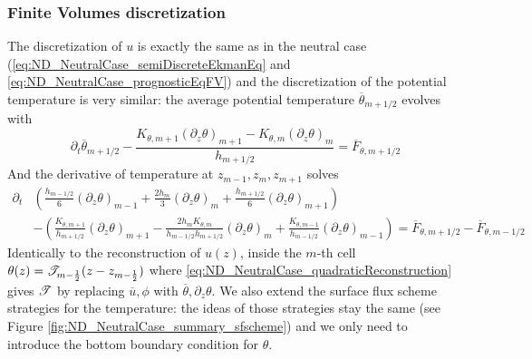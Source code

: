 \subsubsection{Finite Volumes discretization}
\label{sec:ND_StratifiedCase_FVDis}
The discretization of $u$ is exactly the same as in the
neutral case (\eqref{eq:ND_NeutralCase_semiDiscreteEkmanEq} and \eqref{eq:ND_NeutralCase_prognosticEqFV}) and the discretization of 
the potential temperature is very similar:
the average potential temperature $\overline{\theta}_{m+1/2}$
evolves with
\begin{equation}
\label{eq:ND_StratifiedCase_semiDiscreteEkmanEqPT}
    \partial_t \overline{\theta}_{m+1/2}
    - \frac{K_{\theta, m+1} {(\partial_z \theta)}_{m+1} - K_{\theta, m} {(\partial_z \theta)}_m}{h_{m+1/2}}
	= \overline{F}_{\theta, m+1/2}
\end{equation}
And the derivative of temperature at $z_{m-1}, z_m, z_{m+1}$ solves
\begin{equation}
\begin{aligned}
\label{eq:ND_StratifiedCase_prognosticPT_FV}
\partial_t &\left( \frac{h_{m-1/2}}{6} {(\partial_z \theta)}_{m-1} 
+ \frac{2h_m}{3} {(\partial_z \theta)}_m  
+ \frac{h_{m+1/2}}{6} {(\partial_z \theta)}_{m+1} \right) \\
	&-
    \left(
	\frac{K_{\theta, m+1}}{ h_{m+1/2}}{(\partial_z \theta)}_{m+1} - \frac{2 h_m K_{\theta, m}}{h_{m-1/2} h _{m+1/2}}{(\partial_z \theta)}_m + \frac{K_{\theta, m-1}}{ h_{m-1/2}}{(\partial_z \theta)}_{m-1}
    \right)
	= \overline{F}_{\theta, m+1/2} - \overline{F}_{\theta, m-1/2}
\end{aligned}
\end{equation}
Identically to the reconstruction of $u(z)$,
inside the $m$-th cell
$\theta(z) = {\cal T}_{m-\frac{1}{2}}(z-z_{m-\frac{1}{2}})$
where \eqref{eq:ND_NeutralCase_quadraticReconstruction}
gives ${\cal T}$ by replacing $\overline{u}, \phi$
with $\overline{\theta}, \partial_z \theta$.
We also extend the surface flux scheme strategies for the temperature:
the ideas of those strategies stay the same
(see Figure \ref{fig:ND_NeutralCase_summary_sfscheme}) and we only
need to introduce the bottom boundary condition for $\theta$.
